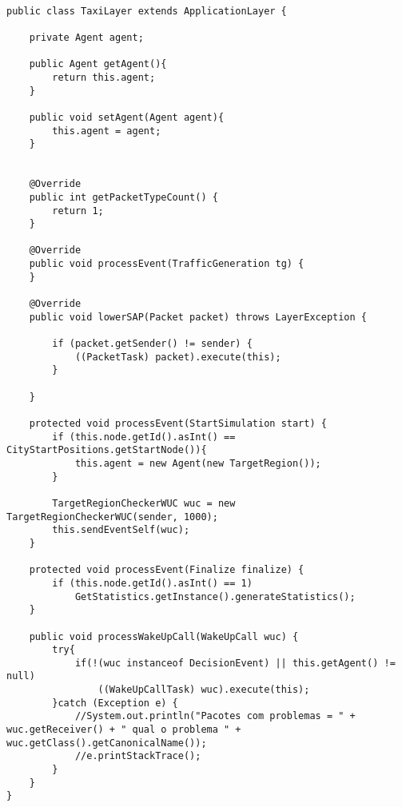 \begin{lstlisting}

public class TaxiLayer extends ApplicationLayer {

	private Agent agent;
	
	public Agent getAgent(){
		return this.agent;
	}
	
	public void setAgent(Agent agent){
		this.agent = agent;
	}


	@Override
	public int getPacketTypeCount() {
		return 1;
	}
	
	@Override
	public void processEvent(TrafficGeneration tg) {
	}

	@Override
	public void lowerSAP(Packet packet) throws LayerException {

		if (packet.getSender() != sender) {
			((PacketTask) packet).execute(this);
		}
		
	}

	protected void processEvent(StartSimulation start) {
		if (this.node.getId().asInt() == CityStartPositions.getStartNode()){
			this.agent = new Agent(new TargetRegion());
		}
	
		TargetRegionCheckerWUC wuc = new TargetRegionCheckerWUC(sender, 1000);
		this.sendEventSelf(wuc);
	}

	protected void processEvent(Finalize finalize) {
		if (this.node.getId().asInt() == 1)
			GetStatistics.getInstance().generateStatistics();
	}

	public void processWakeUpCall(WakeUpCall wuc) {
		try{
			if(!(wuc instanceof DecisionEvent) || this.getAgent() != null)
				((WakeUpCallTask) wuc).execute(this);
		}catch (Exception e) {
			//System.out.println("Pacotes com problemas = " + wuc.getReceiver() + " qual o problema " + wuc.getClass().getCanonicalName());
			//e.printStackTrace();
		}
	}
}
\end{lstlisting}
